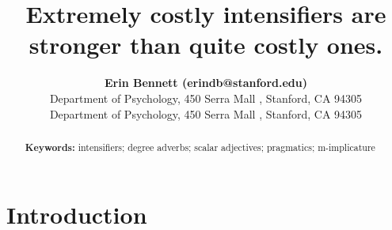 \documentclass[10pt,letterpaper]{article}
\title{Extremely costly intensifiers are stronger than quite costly ones.}
\author{{\large \bf Erin Bennett (erindb@stanford.edu)} \\
  Department of Psychology, 450 Serra Mall , Stanford, CA 94305
  \AND {\large \bf Noah Goodman (ngoodman@stanford.edu)} \\
  Department of Psychology, 450 Serra Mall , Stanford, CA 94305}
\begin{document}
\maketitle


\begin{abstract}


\textbf{Keywords:} 
intensifiers; degree adverbs; scalar adjectives; pragmatics; m-implicature
\end{abstract}


\section{Introduction}




\end{document}
